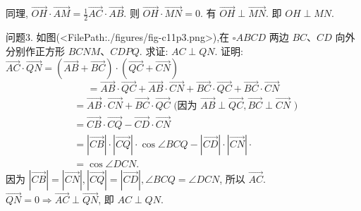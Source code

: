同理, $\overrightarrow{O H} \cdot \overrightarrow{A M}=\frac{1}{2} \overrightarrow{A C} \cdot \overrightarrow{A B}$.
则 $\overrightarrow{O H} \cdot \overrightarrow{M N}=0$. 有 $\overrightarrow{O H} \perp \overrightarrow{M N}$. 即 $O H \perp M N$.



问题3. 如图(<FilePath:./figures/fig-c11p3.png>),在 $\square A B C D$ 两边 $B C 、 C D$ 向外分别作正方形 $B C N M 、 C D P Q$. 求证: $A C \perp Q N$.
证明: $\overrightarrow{A C} \cdot \overrightarrow{Q N}=(\overrightarrow{A B}+\overrightarrow{B C}) \cdot(\overrightarrow{Q C}+\overrightarrow{C N})$
$$
=\overrightarrow{A B} \cdot \overrightarrow{Q C}+\overrightarrow{A B} \cdot \overrightarrow{C N}+\overrightarrow{B C} \cdot \overrightarrow{Q C}+\overrightarrow{B C} \cdot \overrightarrow{C N}
$$
$$
\begin{aligned}
& =\overrightarrow{A B} \cdot \overrightarrow{C N}+\overrightarrow{B C} \cdot \overrightarrow{Q C} \text { (因为 } \overrightarrow{A B} \perp \overrightarrow{Q C}, \overrightarrow{B C} \perp \overrightarrow{C N} \text { ) } \\
& =\overrightarrow{C B} \cdot \overrightarrow{C Q}-\overrightarrow{C D} \cdot \overrightarrow{C N} \\
& =|\overrightarrow{C B}| \cdot|\overrightarrow{C Q}| \cdot \cos \angle B C Q-|\overrightarrow{C D}| \cdot|\overrightarrow{C N}| \cdot \\
& =\cos \angle D C N .
\end{aligned}
$$
因为 $|\overrightarrow{C B}|=|\overrightarrow{C N}|,|\overrightarrow{C Q}|=|\overrightarrow{C D}|, \angle B C Q=\angle D C N$, 所以 $\overrightarrow{A C}$. $\overrightarrow{Q N}=0 \Rightarrow \overrightarrow{A C} \perp \overrightarrow{Q N}$, 即 $A C \perp Q N$.



